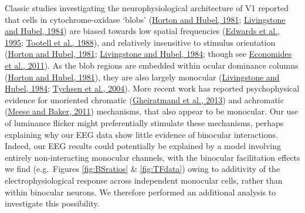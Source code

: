 \documentclass[
]{article}
\begin{document}
Classic studies investigating the neurophysiological architecture of V1 reported that cells in cytochrome-oxidase `blobs' (\protect\hyperlink{ref-Horton1981}{Horton and Hubel, 1981}; \protect\hyperlink{ref-Livingstone1984}{Livingstone and Hubel, 1984}) are biased towards low spatial frequencies (\protect\hyperlink{ref-Edwards1995}{Edwards et al., 1995}; \protect\hyperlink{ref-Tootell1988}{Tootell et al., 1988}), and relatively insensitive to stimulus orientation (\protect\hyperlink{ref-Horton1981}{Horton and Hubel, 1981}; \protect\hyperlink{ref-Livingstone1984}{Livingstone and Hubel, 1984}; though see \protect\hyperlink{ref-Economides2011}{Economides et al., 2011}). As the blob regions are embedded within ocular dominance columns (\protect\hyperlink{ref-Horton1981}{Horton and Hubel, 1981}), they are also largely monocular (\protect\hyperlink{ref-Livingstone1984}{Livingstone and Hubel, 1984}; \protect\hyperlink{ref-Tychsen2004}{Tychsen et al., 2004}). More recent work has reported psychophysical evidence for unoriented chromatic (\protect\hyperlink{ref-Gheiratmand2013}{Gheiratmand et al., 2013}) and achromatic (\protect\hyperlink{ref-Meese2011}{Meese and Baker, 2011}) mechanisms, that also appear to be monocular. Our use of luminance flicker might preferentially stimulate these mechanisms, perhaps explaining why our EEG data show little evidence of binocular interactions. Indeed, our EEG results could potentially be explained by a model involving entirely non-interacting monocular channels, with the binocular facilitation effects we find (e.g.~Figures \ref{fig:BSratios} \& \ref{fig:TFdata}) owing to additivity of the electrophysiological response across independent monocular cells, rather than within binocular neurons. We therefore performed an additional analysis to investigate this possibility.
\end{document}
